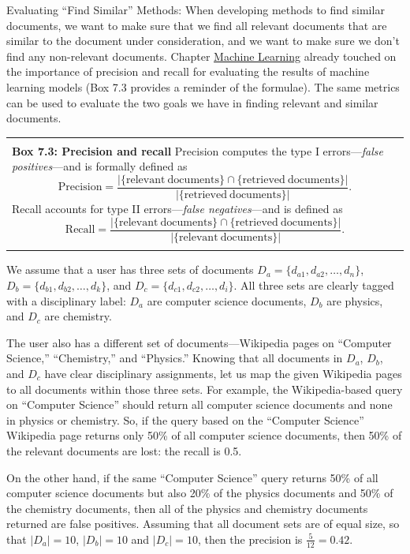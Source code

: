 \documentclass[]{krantz}
\newenvironment{F00}
    {\begin{center}
    \begin{tabular}{|p{0.9\textwidth}|}
    \hline\\
    }
    { 
    \\\\\hline
    \end{tabular} 
    \end{center}
    }
\begin{document}
Evaluating ``Find Similar'' Methods: When developing methods to find
similar documents, we want to make sure that we find all relevant
documents that are similar to the document under consideration, and we
want to make sure we don't find any non-relevant documents. Chapter
\protect\hyperlink{chap:ml}{Machine Learning} already touched on the
importance of precision and recall for evaluating the results of machine
learning models (Box 7.3 provides a reminder of the formulae). The same
metrics can be used to evaluate the two goals we have in finding
relevant and similar documents.

\begin{F00}
\textbf{Box 7.3: Precision and recall} Precision computes the type I
errors---\emph{false positives}---and is formally defined as
\[\mathrm{Precision} = \frac{|\{\mathrm{relevant\ documents}\}\cap \{\mathrm{retrieved\ documents}\}|}{|\{\mathrm{retrieved\ documents}\}|}.\]
Recall accounts for type II errors---\emph{false negatives}---and is
defined as
\[\mathrm{Recall}=\frac{|\{\mathrm{relevant\ documents}\}\cap \{\mathrm{retrieved\ documents}\}|}{|\{\mathrm{relevant\ documents}\}|}.\]
\end{F00}

We assume that a user has three sets of documents
\(D_a =\{d_{a1},d_{a2},\ldots, d_n\}\),
\(D_b=\{d_{b1}, d_{b2}, \ldots, d_k\}\), and
\(D_c =\{d_{c1},d_{c2},\ldots,d_i\}\). All three sets are clearly tagged
with a disciplinary label: \(D_a\) are computer science documents,
\(D_b\) are physics, and \(D_c\) are chemistry.

The user also has a different set of documents---Wikipedia pages on
``Computer Science,'' ``Chemistry,'' and ``Physics.'' Knowing that all
documents in \(D_a\), \(D_b\), and \(D_c\) have clear disciplinary
assignments, let us map the given Wikipedia pages to all documents
within those three sets. For example, the Wikipedia-based query on
``Computer Science'' should return all computer science documents and
none in physics or chemistry. So, if the query based on the ``Computer
Science'' Wikipedia page returns only 50\% of all computer science
documents, then 50\% of the relevant documents are lost: the recall is
0.5.

On the other hand, if the same ``Computer Science'' query returns 50\%
of all computer science documents but also 20\% of the physics documents
and 50\% of the chemistry documents, then all of the physics and
chemistry documents returned are false positives. Assuming that all
document sets are of equal size, so that \(|D_a| = 10\), \(|D_b|=10\)
and \(|D_c| = 10\), then the precision is \(\frac{5}{12} = 0.42\).
\end{document}
